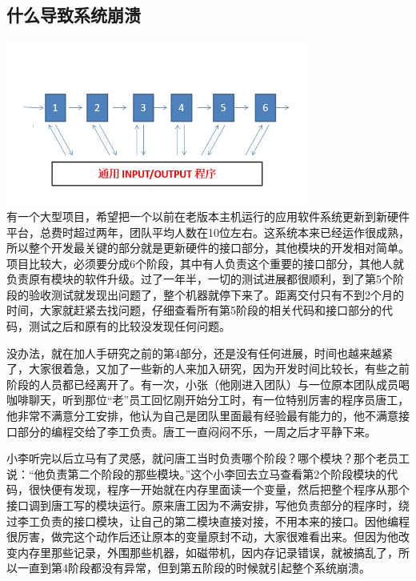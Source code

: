 \hypertarget{ux4ec0ux4e48ux5bfcux81f4ux7cfbux7edfux5d29ux6e83}{%
\subsection{什么导致系统崩溃}\label{ux4ec0ux4e48ux5bfcux81f4ux7cfbux7edfux5d29ux6e83}}

\includegraphics[width=10cm]{TC6stagesNioScreenshot_2022-10-27_192322.jpg}\\

有一个大型项目，希望把一个以前在老版本主机运行的应用软件系统更新到新硬件平台，总费时超过两年，团队平均人数在10位左右。这系统本来已经运作很成熟，所以整个开发最关键的部分就是更新硬件的接口部分，其他模块的开发相对简单。项目比较大，必须要分成6个阶段，其中有人负责这个重要的接口部分，其他人就负责原有模块的软件升级。过了一年半，一切的测试进展都很顺利，到了第5个阶段的验收测试就发现出问题了，整个机器就停下来了。距离交付只有不到2个月的时间，大家就赶紧去找问题，仔细查看所有第5阶段的相关代码和接口部分的代码，测试之后和原有的比较没发现任何问题。

没办法，就在加人手研究之前的第4部分，还是没有任何进展，时间也越来越紧了，大家很着急，又加了一些新的人来加入研究，因为开发时间比较长，有些之前阶段的人员都已经离开了。有一次，小张（他刚进入团队）与一位原本团队成员喝咖啡聊天，听到那位``老''员工回忆刚开始分工时，有一位特别厉害的程序员唐工，他非常不满意分工安排，他认为自己是团队里面最有经验最有能力的，他不满意接口部分的编程交给了李工负责。唐工一直闷闷不乐，一周之后才平静下来。

小李听完以后立马有了灵感，就问唐工当时负责哪个阶段？哪个模块？那个老员工说：“他负责第二个阶段的那些模块。”这个小李回去立马查看第2个阶段模块的代码，很快便有发现，程序一开始就在内存里面读一个变量，然后把整个程序从那个接口调到唐工写的模块运行。原来唐工因为不满安排，写他负责部分的程序时，绕过李工负责的接口模块，让自己的第二模块直接对接，不用本来的接口。因他编程很厉害，做完这个动作后还让原本的变量原封不动，大家很难看出来。但因为他改变内存里那些记录，外围那些机器，如磁带机，因内存记录错误，就被搞乱了，所以一直到第4阶段都没有异常，但到第五阶段的时候就引起整个系统崩溃。

